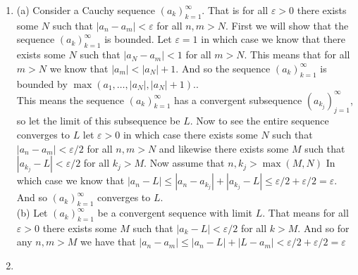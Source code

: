 \documentclass[12pt]{amsart}
\begin{document}
\begin{enumerate}
\item (a) Consider a Cauchy sequence $(a_k)_{k=1}^{\infty}$. That is for all $\varepsilon>0$ there exists some $N$
such that $|a_n-a_m|<\varepsilon$ for all $n,m>N$. First we will show that the sequence $(a_k)_{k=1}^{\infty}$ is bounded. 
Let $\varepsilon=1$ in which case we know that there exists some $N$ such that $|a_N-a_m|<1$ for all $m>N$. This means that 
for all $m>N$ we know that $|a_m|<|a_N|+1$. And so the sequence $(a_k)_{k=1}^{\infty}$ is bounded by $\max(a_1,\dots,|a_N|,|a_N|+1)$..\\
This means the sequence $(a_k)_{k=1}^{\infty}$ has a convergent subsequence $(a_{k_j})_{j=1}^{\infty}$, so let the limit of this subsequence be $L$. 
Now to see the entire sequence converges to $L$ let $\varepsilon>0$ in which case there exists some $N$ such that $|a_n-a_m|<\varepsilon/2$ 
for all $n,m>N$ and likewise there exists some $M$ such that $|a_{k_j}-L|<\varepsilon/2$ for all $k_j>M$. Now assume that $n,k_j>\max(M,N)$ 
In which case we know that $|a_n-L|\leq |a_n-a_{k_j}|+|a_{k_j}-L|\leq \varepsilon/2+\varepsilon/2=\varepsilon$. And so $(a_k)_{k=1}^{\infty}$ 
converges to $L$.\\
(b) Let $(a_k)_{k=1}^{\infty}$ be a convergent sequence with limit $L$. That means for all $\varepsilon>0$ there exists some $M$ such that 
$|a_k-L|<\varepsilon/2$ for all $k>M$. And so for any $n,m>M$ we have that $|a_n-a_m|\leq |a_n-L|+|L-a_m|< \varepsilon/2+\varepsilon/2=\varepsilon$\\

\item

\end{enumerate}
\end{document}
